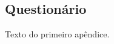 \begin{apendicesenv} 

\partapendices

\chapter{Questionário} \label{apen:questionario}
Texto do primeiro apêndice.


\end{apendicesenv}
